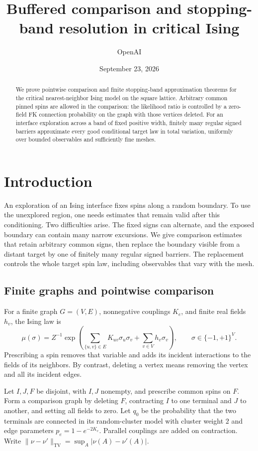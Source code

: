 \documentclass[11pt]{article}
\title{Buffered comparison and stopping-band resolution in critical Ising}
\author{OpenAI}
\date{September 23, 2026}
\theoremstyle{definition}
\theoremstyle{remark}
\numberwithin{equation}{section}
\begin{document}
\maketitle
\begin{abstract}
We prove pointwise comparison and finite stopping-band approximation
theorems for the critical nearest-neighbor Ising model on the square
lattice. Arbitrary common pinned spins are allowed in the comparison:
the likelihood ratio is controlled by a zero-field FK connection
probability on the graph with those vertices deleted. For an interface
exploration across a band of fixed positive width, finitely many regular
signed barriers approximate every good conditional target law in total
variation, uniformly over bounded observables and sufficiently fine
meshes.
\end{abstract}
\section{Introduction}\label{in:section}

An exploration of an Ising interface fixes spins along a random boundary.
To use the unexplored region, one needs estimates that remain valid after
this conditioning. Two difficulties arise. The fixed signs can alternate,
and the exposed boundary can contain many narrow excursions. We give
comparison estimates that retain arbitrary common signs, then replace
the boundary visible from a distant target by one of finitely many
regular signed barriers. The replacement controls the whole target
spin law, including observables that vary with the mesh.

\subsection{Finite graphs and pointwise comparison}
For a finite graph $G=(V,E)$, nonnegative couplings $K_e$, and finite real
fields $h_v$, the Ising law is
\[
 \mu(\sigma)=Z^{-1}\exp\!\left(
   \sum_{\{u,v\}\in E}K_{uv}\sigma_u\sigma_v
       +\sum_{v\in V}h_v\sigma_v\right),
 \qquad \sigma\in\{-1,+1\}^{V}.
\]
Prescribing a spin removes that variable and adds its incident
interactions to the fields of its neighbors. By contrast, deleting a
vertex means removing the vertex and all its incident edges.

Let $I,J,F$ be disjoint, with $I,J$ nonempty, and prescribe common spins
on $F$. Form a comparison graph by deleting $F$, contracting $I$ to one
terminal and $J$ to another, and setting all fields to zero. Let $q_0$
be the probability that the two terminals are connected in its
random-cluster model with cluster weight $2$ and edge parameters
$p_e=1-e^{-2K_e}$. Parallel couplings are added on contraction. Write
$\|\nu-\nu'\|_{\mathrm{TV}}=\sup_A|\nu(A)-\nu'(A)|$.
\end{document}
